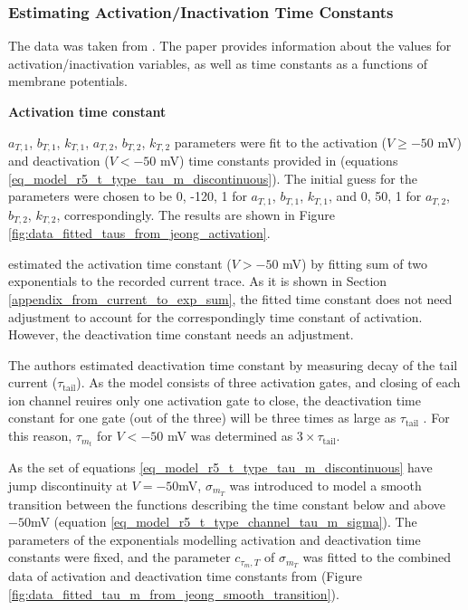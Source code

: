 \documentclass[../../workflow.tex]{subfiles}
\begin{document}
\subsubsection{Estimating Activation/Inactivation Time Constants}\label{sec_model_t_type_channel_time_constants}

The data was taken from \cite{jeongCaa1TFlyTtype2015}. The paper provides
information about the values for activation/inactivation variables, as well as time constants
as a functions of membrane potentials. 

\textbf{Activation time constant}

$a_{T,1}$, $b_{T,1}$, $k_{T,1}$, $a_{T,2}$, $b_{T,2}$, $k_{T,2}$ parameters were fit to the activation
($V \geq -50$ mV) and deactivation ($V < -50$ mV) time constants provided in \cite{jeongCaa1TFlyTtype2015}
(equations \ref{eq_model_r5_t_type_tau_m_discontinuous}).
The initial guess for the parameters were chosen to be 0, -120, 1 for $a_{T,1}$, $b_{T,1}$, $k_{T,1}$,
and 0, 50, 1 for $a_{T,2}$, $b_{T,2}$, $k_{T,2}$, correspondingly. The results are shown in Figure
\ref{fig:data_fitted_taus_from_jeong_activation}.

\cite{jeongCaa1TFlyTtype2015} estimated the activation time constant ($V>-50$ mV) by fitting
sum of two exponentials to the recorded current trace. As it is shown in Section \ref{appendix_from_current_to_exp_sum},
the fitted time constant does not need adjustment to account for the correspondingly
time constant of activation. However, the deactivation time constant needs an adjustment.

The authors estimated deactivation time constant by measuring decay of the tail current ($\tau_{\text{tail}}$).
As the model consists of three activation gates, and closing of each ion channel reuires
only one activation gate to close, the deactivation time constant for one gate (out of the three)
will be three times as large as $\tau_{\text{tail}}$ \cite{huguenardSimulationCurrentsInvolved1992}.
For this reason, $\tau_{m_t}$ for $V<-50$ mV was determined as $3\times\tau_{\text{tail}}$.

As the set of equations \ref{eq_model_r5_t_type_tau_m_discontinuous} have jump discontinuity at
$V=-50$mV, $\sigma_{m_T}$ was introduced to model a smooth transition between the functions
describing the time constant below and above $-50$mV (equation \ref{eq_model_r5_t_type_channel_tau_m_sigma}).
The parameters of the exponentials modelling activation and deactivation time constants were
fixed, and the parameter $c_{\tau_m,T}$ of $\sigma_{m_T}$ was fitted to the combined data of activation
and deactivation time constants from \cite{jeongCaa1TFlyTtype2015} (Figure \ref{fig:data_fitted_tau_m_from_jeong_smooth_transition}).
\end{document}
